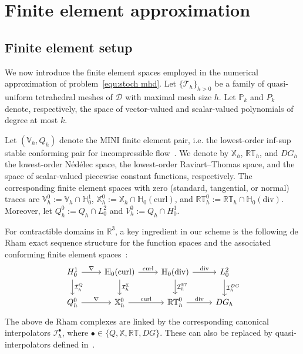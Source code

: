\documentclass[11pt, reqno]{amsart}
\theoremstyle{definition}
\numberwithin{equation}{section}
\newcommand{\bb}{\mathbb}
\newcommand{\hzerodiv}{\mathbb{H}_0(\mathrm{div})}
\newcommand{\hzerocurl}{\mathbb{H}_0(\mathrm{curl})}
\begin{document}
\section{Finite element approximation}
\label{sec:fem}

\subsection{Finite element setup}

We now introduce the finite element spaces employed in the numerical approximation of problem~\eqref{equ:stoch mhd}. Let $\{\mathcal{T}_h\}_{h>0}$ be a family of quasi-uniform tetrahedral meshes of $\mathscr{D}$ with maximal mesh size $h$. Let $\bb{P}_k$ and $P_k$ denote, respectively, the space of vector-valued and scalar-valued polynomials of degree at most $k$. 

Let $(\bb{V}_h, Q_h)$ denote the MINI finite element pair, i.e. the lowest-order inf-sup stable conforming pair for incompressible flow~\cite{Vol16}. We denote by $\bb{X}_h$, $\bb{RT}_h$, and $DG_h$ the lowest-order N\'ed\'elec space, the lowest-order Raviart--Thomas space, and the space of scalar-valued piecewise constant functions, respectively.
The corresponding finite element spaces with zero (standard, tangential, or normal) traces are $\bb{V}_h^0:= \bb{V}_h\cap \bb{H}^1_0$, $\bb{X}_h^0:= \bb{X}_h\cap \hzerocurl$, and $\bb{RT}_h^0 := \bb{RT}_h \cap \hzerodiv$. Moreover, let $Q_h^0:= Q_h\cap L^2_0$ and $V_h^0:= Q_h\cap H^1_0$.


For contractible domains in $\bb{R}^3$, a key ingredient in our scheme is the following de Rham exact sequence structure for the function spaces and the associated conforming finite element spaces~\cite{ArnFalWin06}:
\begin{equation}\label{equ:comm}
	\begin{tikzcd}
		H^1_0 \arrow[r, "\nabla"] \arrow[d, "\mathcal{I}_h^Q"] & \hzerocurl \arrow[r, "\mathrm{curl}"] \arrow[d, "\mathcal{I}_h^{\bb{X}}"] & \hzerodiv \arrow[r, "\mathrm{div}"] \arrow[d, "\mathcal{I}_h^{\bb{RT}}"] & L^2_0 \arrow[d, "\mathcal{I}_h^{DG}"] \\
		Q_{h}^0 \arrow[r, "\nabla"] & \mathbb{X}_h^0 \arrow[r, "\mathrm{curl}"]                                                     & \mathbb{RT}_h^0 \arrow[r, "\mathrm{div}"]                     & DG_h              
	\end{tikzcd}
\end{equation}
The above de Rham complexes are linked by the corresponding canonical interpolators $\mathcal{I}_h^\bullet$, where $\bullet\in \{Q, \bb{X}, \bb{RT}, DG\}$. These can also be replaced by quasi-interpolators defined in~\cite{ErnGue17}.
\end{document}
